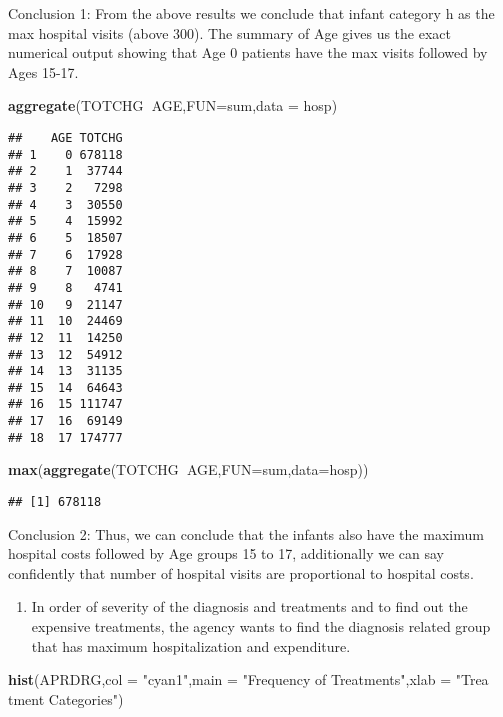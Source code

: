 \documentclass[
]{article}
\newenvironment{Shaded}{\begin{snugshade}}{\end{snugshade}}
\newcommand{\DataTypeTok}[1]{\textcolor[rgb]{0.13,0.29,0.53}{#1}}
\newcommand{\KeywordTok}[1]{\textcolor[rgb]{0.13,0.29,0.53}{\textbf{#1}}}
\newcommand{\NormalTok}[1]{#1}
\newcommand{\OperatorTok}[1]{\textcolor[rgb]{0.81,0.36,0.00}{\textbf{#1}}}
\newcommand{\StringTok}[1]{\textcolor[rgb]{0.31,0.60,0.02}{#1}}
\providecommand{\tightlist}{%
  \setlength{\itemsep}{0pt}\setlength{\parskip}{0pt}}
\begin{document}
Conclusion 1: From the above results we conclude that infant category h
as the max hospital visits (above 300). The summary of Age gives us the
exact numerical output showing that Age 0 patients have the max visits
followed by Ages 15-17.

\begin{Shaded}
\begin{Highlighting}[]
\KeywordTok{aggregate}\NormalTok{(TOTCHG}\OperatorTok{~}\NormalTok{AGE,}\DataTypeTok{FUN=}\NormalTok{sum,}\DataTypeTok{data =}\NormalTok{ hosp) }
\end{Highlighting}
\end{Shaded}

\begin{verbatim}
##    AGE TOTCHG
## 1    0 678118
## 2    1  37744
## 3    2   7298
## 4    3  30550
## 5    4  15992
## 6    5  18507
## 7    6  17928
## 8    7  10087
## 9    8   4741
## 10   9  21147
## 11  10  24469
## 12  11  14250
## 13  12  54912
## 14  13  31135
## 15  14  64643
## 16  15 111747
## 17  16  69149
## 18  17 174777
\end{verbatim}

\begin{Shaded}
\begin{Highlighting}[]
\KeywordTok{max}\NormalTok{(}\KeywordTok{aggregate}\NormalTok{(TOTCHG}\OperatorTok{~}\NormalTok{AGE,}\DataTypeTok{FUN=}\NormalTok{sum,}\DataTypeTok{data=}\NormalTok{hosp)) }
\end{Highlighting}
\end{Shaded}

\begin{verbatim}
## [1] 678118
\end{verbatim}

Conclusion 2: Thus, we can conclude that the infants also have the
maximum hospital costs followed by Age groups 15 to 17, additionally we
can say confidently that number of hospital visits are proportional to
hospital costs.

\begin{enumerate}
\def\labelenumi{\Roman{enumi}.}
\setcounter{enumi}{1}
\tightlist
\item
  In order of severity of the diagnosis and treatments and to find out
  the expensive treatments, the agency wants to find the diagnosis
  related group that has maximum hospitalization and expenditure.
\end{enumerate}

\begin{Shaded}
\begin{Highlighting}[]
\KeywordTok{hist}\NormalTok{(APRDRG,}\DataTypeTok{col =} \StringTok{"cyan1"}\NormalTok{,}\DataTypeTok{main =} \StringTok{"Frequency of Treatments"}\NormalTok{,}\DataTypeTok{xlab =} \StringTok{"Trea tment Categories"}\NormalTok{) }
\end{Highlighting}
\end{Shaded}
\end{document}
